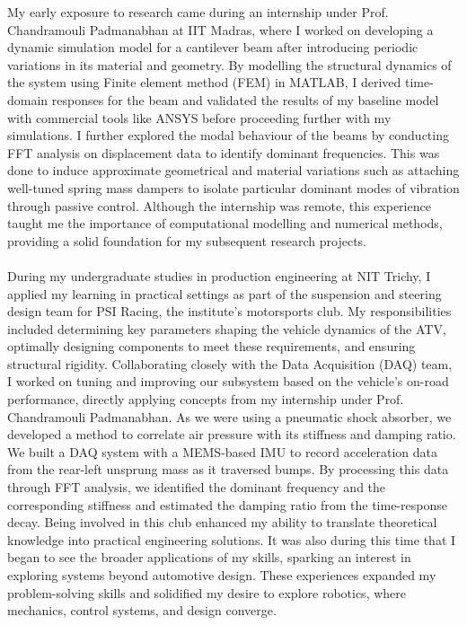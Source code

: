 \documentclass[10pt]{article}
\begin{document}
My early exposure to research came during an internship under Prof. Chandramouli Padmanabhan at IIT Madras, where I worked on developing a dynamic simulation model for a cantilever beam after introducing periodic variations in its material and geometry. By modelling the structural dynamics of the system using Finite element method (FEM) in MATLAB, I derived time-domain responses for the beam and validated the results of my baseline model with commercial tools like ANSYS before proceeding further with my simulations. I further explored the modal behaviour of the beams by conducting FFT analysis on displacement data to identify dominant frequencies. This was done to induce approximate geometrical and material variations such as attaching well-tuned spring mass dampers to isolate particular dominant modes of vibration through passive control. Although the internship was remote, this experience taught me the importance of computational modelling and numerical methods, providing a solid foundation for my subsequent research projects. \\ \\During my undergraduate studies in production engineering at NIT Trichy, I applied my learning in practical settings as part of the suspension and steering design team for PSI Racing, the institute’s motorsports club. My responsibilities included determining key parameters shaping the vehicle dynamics of the ATV, optimally designing components to meet these requirements, and ensuring structural rigidity. Collaborating closely with the Data Acquisition (DAQ) team, I worked on tuning and improving our subsystem based on the vehicle’s on-road performance, directly applying concepts from my internship under Prof. Chandramouli Padmanabhan. As we were using a pneumatic shock absorber, we developed a method to correlate air pressure with its stiffness and damping ratio. We built a DAQ system with a MEMS-based IMU to record acceleration data from the rear-left unsprung mass as it traversed bumps. By processing this data through FFT analysis, we identified the dominant frequency and the corresponding stiffness and estimated the damping ratio from the time-response decay. Being involved in this club enhanced my ability to translate theoretical knowledge into practical engineering solutions. It was also during this time that I began to see the broader applications of my skills, sparking an interest in exploring systems beyond automotive design. These experiences expanded my problem-solving skills and solidified my desire to explore robotics, where mechanics, control systems, and design converge. \\ \\
\end{document}
